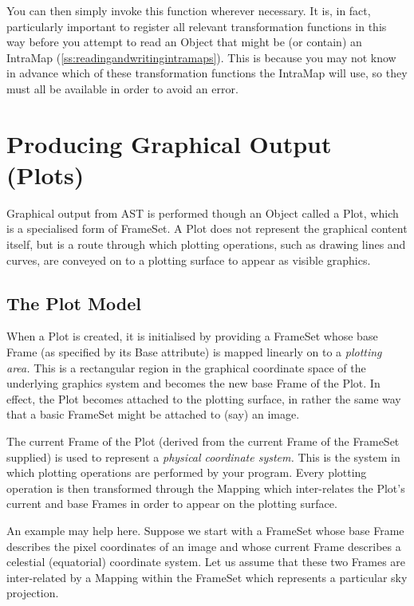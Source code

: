 \documentclass[twoside,11pt]{article}
\newcommand{\htmlref}[2]{#1}
\newcommand{\secref}[1]{\S\ref{#1}}
\renewcommand{\secref}[1]{\ref{#1}}
\begin{document}
You can then simply invoke this function wherever necessary. It is, in
fact, particularly important to register all relevant transformation
functions in this way before you attempt to read an \htmlref{Object}{Object} that might
be (or contain) an \htmlref{IntraMap}{IntraMap}
(\secref{ss:readingandwritingintramaps}). This is because you may not
know in advance which of these transformation functions the IntraMap
will use, so they must all be available in order to avoid an error.

\cleardoublepage
\section{\label{ss:plots}Producing Graphical Output (Plots)}

Graphical output from AST is performed though an \htmlref{Object}{Object} called a \htmlref{Plot}{Plot},
which is a specialised form of \htmlref{FrameSet}{FrameSet}. A Plot does not represent the
graphical content itself, but is a route through which plotting
operations, such as drawing lines and curves, are conveyed on to a
plotting surface to appear as visible graphics.

\subsection{The Plot Model}

When a \htmlref{Plot}{Plot} is created, it is initialised by providing a \htmlref{FrameSet}{FrameSet}
whose base \htmlref{Frame}{Frame} (as specified by its \htmlref{Base}{Base} attribute) is mapped
linearly on to a {\em{plotting area.}} This is a rectangular region in
the graphical coordinate space of the underlying graphics system and
becomes the new base Frame of the Plot. In effect, the Plot becomes
attached to the plotting surface, in rather the same way that a basic
FrameSet might be attached to (say) an image.

The current Frame of the Plot (derived from the current Frame of the
FrameSet supplied) is used to represent a {\em{physical coordinate
system.}} This is the system in which plotting operations are
performed by your program.  Every plotting operation is then
transformed through the \htmlref{Mapping}{Mapping} which inter-relates the Plot's current
and base Frames in order to appear on the plotting surface.

An example may help here. Suppose we start with a FrameSet whose base
Frame describes the pixel coordinates of an image and whose current
Frame describes a celestial (equatorial) coordinate system. Let us
assume that these two Frames are inter-related by a Mapping within the
FrameSet which represents a particular sky projection.
\end{document}
